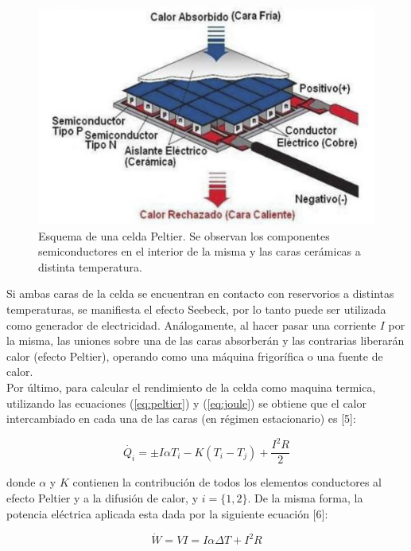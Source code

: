 \documentclass[twoside,twocolumn,a4paper]{article}
\begin{document}
\begin{figure}[H]
\includegraphics[width=\linewidth]{celda.jpg}
\caption{Esquema de una celda Peltier. Se observan los componentes semiconductores en el interior de la misma y las caras cer\'amicas a distinta temperatura.}
\label{fig:celda}
\end{figure}

Si ambas caras de la celda se encuentran en contacto con reservorios a distintas temperaturas, se manifiesta el efecto Seebeck, por lo tanto puede ser utilizada como generador de electricidad. An\'alogamente, al hacer pasar una corriente $I$ por la misma, las uniones sobre una de las caras absorber\'an y las contrarias liberar\'an calor (efecto Peltier), operando como una m\'aquina frigor\'ifica o una fuente de calor.\\

Por \'ultimo, para calcular el rendimiento de la celda como maquina termica, utilizando las ecuaciones (\ref{eq:peltier}) y (\ref{eq:joule}) se obtiene que el calor intercambiado en cada una de las caras (en r\'egimen estacionario) es [5]:

\begin{equation}
\label{eq:qcaras}
\dot{Q_{i}} = \pm I\alpha T_{i} - K(T_{i} - T_{j}) + \frac{I^{2}R}{2}
\end{equation}


donde $\alpha$ y $K$ contienen la contribuci\'on de todos los elementos conductores al efecto Peltier y a la difusi\'on de calor, y $i = \{1,2\}$. De la misma forma, la potencia el\'ectrica aplicada esta dada por la siguiente ecuaci\'on [6]:

\begin{equation}
\label{eq:potencia}
\dot{W} = VI = I \alpha \Delta T + I^{2}R
\end{equation}
\end{document}
